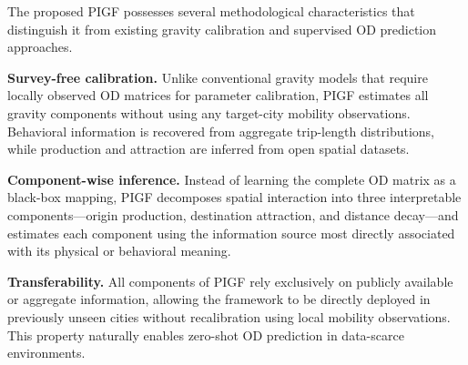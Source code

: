 The proposed PIGF possesses several methodological characteristics that distinguish it from existing gravity calibration and supervised OD prediction approaches.

\textbf{Survey-free calibration.} Unlike conventional gravity models that require locally observed OD matrices for parameter calibration, PIGF estimates all gravity components without using any target-city mobility observations. Behavioral information is recovered from aggregate trip-length distributions, while production and attraction are inferred from open spatial datasets.

\textbf{Component-wise inference.} Instead of learning the complete OD matrix as a black-box mapping, PIGF decomposes spatial interaction into three interpretable components---origin production, destination attraction, and distance decay---and estimates each component using the information source most directly associated with its physical or behavioral meaning.

\textbf{Transferability.} All components of PIGF rely exclusively on publicly available or aggregate information, allowing the framework to be directly deployed in previously unseen cities without recalibration using local mobility observations. This property naturally enables zero-shot OD prediction in data-scarce environments.

